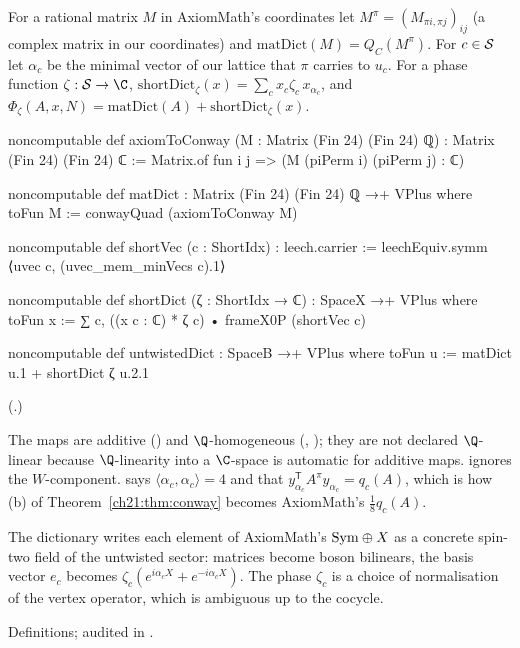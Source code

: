 \begin{definition}\label{ch21:def:dict}
For a rational matrix $M$ in AxiomMath's coordinates let $M^\pi=(M_{\pi i,\pi j})_{ij}$ (a complex
matrix in our coordinates) and $\mathrm{matDict}(M)=Q_C(M^\pi)$.  For $c\in\mathcal{S}$ let $\alpha_c$ be the
minimal vector of our lattice that $\pi$ carries to $u_c$.  For a phase function $\zeta:\chXXIS\to\C$,
$\mathrm{shortDict}_\zeta(x)=\sum_cx_c\zeta_c\,x_{\alpha_c}$, and
$\Phi_\zeta(A,x,N)=\mathrm{matDict}(A)+\mathrm{shortDict}_\zeta(x)$.
\end{definition}
\begin{leancode}
noncomputable def axiomToConway (M : Matrix (Fin 24) (Fin 24) ℚ) : Matrix (Fin 24) (Fin 24) ℂ :=
  Matrix.of fun i j => (M (piPerm i) (piPerm j) : ℂ)
\end{leancode}
\begin{leancode}
noncomputable def matDict : Matrix (Fin 24) (Fin 24) ℚ →+ VPlus where
  toFun M := conwayQuad (axiomToConway M)
\end{leancode}
\begin{leancode}
noncomputable def shortVec (c : ShortIdx) : leech.carrier :=
  leechEquiv.symm ⟨uvec c, (uvec_mem_minVecs c).1⟩
\end{leancode}
\begin{leancode}
noncomputable def shortDict (ζ : ShortIdx → ℂ) : SpaceX →+ VPlus where
  toFun x := ∑ c, ((x c : ℂ) * ζ c) • frameX0P (shortVec c)
\end{leancode}
\begin{leancode}
noncomputable def untwistedDict : SpaceB →+ VPlus where
  toFun u := matDict u.1 + shortDict ζ u.2.1
\end{leancode}
(.)
\begin{dictionary}
The maps are additive () and $\Q$-homogeneous (, );
they are not declared $\Q$-linear because $\Q$-linearity into a $\C$-space is automatic for additive maps.
 ignores the $W$-component.   says
$\langle\alpha_c,\alpha_c\rangle=4$ and  that
$y_{\alpha_c}^{\mathsf T}A^\pi y_{\alpha_c}=q_c(A)$, which is how (b) of
Theorem~\ref{ch21:thm:conway} becomes AxiomMath's $\tfrac18q_c(A)$.
\end{dictionary}
\begin{physics}
The dictionary writes each element of AxiomMath's $\mathrm{Sym}\oplus X$ as a concrete spin-two field of the
untwisted sector: matrices become boson bilinears, the basis vector $e_c$ becomes
$\zeta_c(e^{i\alpha_cX}+e^{-i\alpha_cX})$.  The phase $\zeta_c$ is a choice of normalisation of the
vertex operator, which is ambiguous up to the cocycle.
\end{physics}
\begin{status}
Definitions; audited in .
\end{status}

